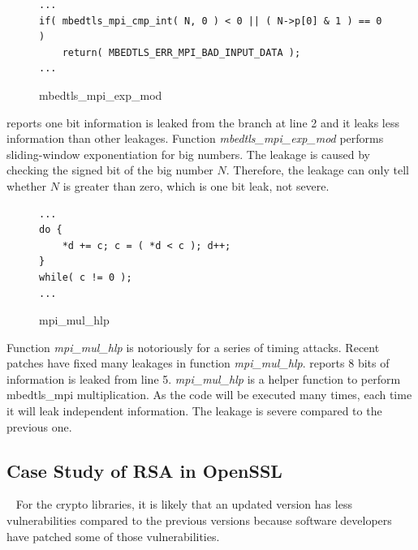 \begin{figure}[h!]
    \centering
\begin{lstlisting}[xleftmargin=.02\textwidth,xrightmargin=.01\textwidth]
...
if( mbedtls_mpi_cmp_int( N, 0 ) < 0 || ( N->p[0] & 1 ) == 0 )
    return( MBEDTLS_ERR_MPI_BAD_INPUT_DATA );
...
\end{lstlisting}
\caption{mbedtls\_mpi\_exp\_mod}
\label{mbedtls_rsa_1}
\end{figure}

\tool{} reports one bit information is leaked from the branch at line 2 and
it leaks less information than other leakages.
Function \emph{mbedtls\_mpi\_exp\_mod} performs sliding-window exponentiation for
big numbers. 
The leakage is caused by checking the signed bit of the big number $N$. 
Therefore, the leakage can only tell whether $N$ is greater than zero, which is one
bit leak, not severe.


\begin{figure}[h!]
    \centering
\begin{lstlisting}[xleftmargin=.02\textwidth,xrightmargin=.01\textwidth]
...
do {
    *d += c; c = ( *d < c ); d++;
}
while( c != 0 );
...
\end{lstlisting}
\caption{mpi\_mul\_hlp}
\label{mbedtls_rsa_2}
\end{figure}

Function \emph{mpi\_mul\_hlp} is notoriously for a series of timing attacks. Recent 
patches have fixed many leakages in function \emph{mpi\_mul\_hlp}.
\tool{} reports 8 bits of information is leaked from line 5. 
\emph{mpi\_mul\_hlp} is a helper function to perform
mbedtls\_mpi multiplication. As the code will be executed many times,
each time it will leak independent information. The leakage is severe 
compared to the previous one.

\subsection{Case Study of RSA in OpenSSL}~\label{sec::eval_rsa}
For the crypto libraries, it is likely that an updated version has less vulnerabilities
compared to the previous versions because software developers have patched some
of those vulnerabilities.  

